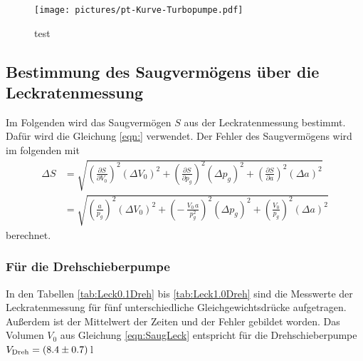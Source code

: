 \begin{figure}[H] %
  \centering
  \texttt{[image: pictures/pt-Kurve-Turbopumpe.pdf]}
  \caption{test}
  \label{fig:test}
\end{figure}





\subsection{Bestimmung des Saugvermögens über die Leckratenmessung}
Im Folgenden wird das Saugvermögen $S$ aus der Leckratenmessung bestimmt. Dafür wird die Gleichung \eqref{eqn:} verwendet. Der Fehler des Saugvermögens wird im folgenden mit
\begin{align}
  \Delta S &= \sqrt{ \left(\frac{\partial S}{\partial V_0} \right)^2 (\Delta V_0)^2 + \left(\frac{\partial S}{\partial p_g} \right)^2 (\Delta p_g)^2 + \left(\frac{\partial S}{\partial a} \right)^2 (\Delta a)^2 } \nonumber \\
  &= \sqrt{ \left(\frac{a}{p_g} \right)^2 (\Delta V_0)^2 + \left(-\,\frac{V_0\,a}{p_g^2} \right)^2 (\Delta p_g)^2 + \left(\frac{V_0}{p_g} \right)^2 (\Delta a)^2 }
\end{align}
berechnet.

\subsubsection{Für die Drehschieberpumpe}
In den Tabellen \eqref{tab:Leck0.1Dreh} bis \eqref{tab:Leck1.0Dreh} sind die Messwerte der Leckratenmessung für fünf unterschiedliche Gleichgewichtsdrücke aufgetragen. Außerdem ist der Mittelwert der Zeiten und der Fehler gebildet worden. Das Volumen $V_0$ aus Gleichung \eqref{eqn:SaugLeck} entspricht für die Drehschieberpumpe $V_\text{Dreh} = (\num{8.4 +- 0.7})$\,l

